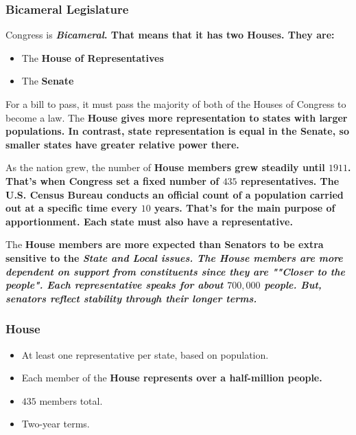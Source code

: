 
\subsubsection*{Bicameral Legislature}

\begin{definition}[Bicameral]
    Congress is \bf{\it{Bicameral}}. That means that it has two Houses. They are:
    
    \begin{itemize}
        \item The \bf{House of Representatives}
        \item The \bf{Senate}
    \end{itemize}
    
    For a bill to pass, it must pass the majority of both of the Houses of Congress to become a law. The \bf{House} gives more representation to states with larger populations. In contrast, state representation is equal in the \bf{Senate}, so smaller states have greater relative power there.
\end{definition}

As the nation grew, the number of \bf{House} members grew steadily until $1911$. That's when Congress set a fixed number of $435$ representatives. The \bf{U.S. Census Bureau} conducts an official count of a population carried out at a specific time every $10$ years. That's for the main purpose of apportionment. Each state must also have a representative.

The \bf{House} members are more expected than \bf{Senators} to be extra sensitive to the \it{State} and \it{Local} issues. The \bf{House} members are more dependent on support from constituents since they are \it{""Closer to the people"}. Each representative speaks for about $700,000$ people. But, senators reflect stability through their longer terms.

\subsubsection*{House}

\begin{itemize}
    \item At least one representative per state, based on population.
    \item Each member of the \bf{House} represents over a half-million people.
    \item $435$ members total.
    \item Two-year terms.
\end{itemize}

